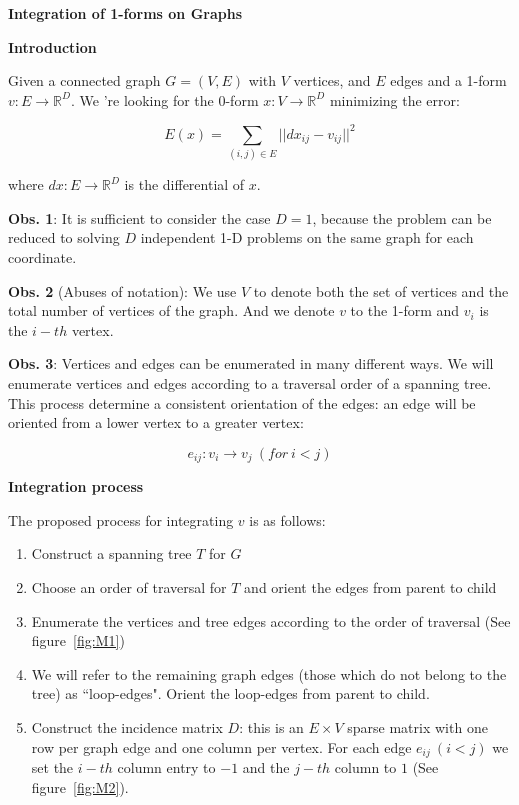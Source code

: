 \documentclass[a4paper,11pt]{article}
\begin{document}
\textbf{Integration of 1-forms on Graphs}

\bigskip

\textbf{Introduction}

\bigskip

Given a connected graph $G=(V,E)$ with $V$ vertices, and $E$ edges and a 
1-form $v: E \rightarrow \mathbb{R}^D$. We 're looking for the 0-form 
$x: V \rightarrow \mathbb{R}^D$ minimizing the error:

$$E(x) = \sum_{(i,j) \in E} ||dx_{ij} - v_{ij}||^2$$

where $dx: E \rightarrow \mathbb{R}^D$ is the differential of $x$.

\bigskip

\textbf{Obs. 1}: It is sufficient to consider the case $D=1$, because 
the problem can be reduced to solving $D$ independent 1-D problems on 
the same graph for each coordinate.

\bigskip

\textbf{Obs. 2} (Abuses of notation): We use $V$ to denote both the set 
of vertices and the total number of vertices of the graph. And we denote 
$v$ to the 1-form and $v_i$ is the $i-th$ vertex.

\bigskip

\textbf{Obs. 3}: Vertices and edges can be enumerated in many different 
ways. We will enumerate vertices and edges according to a traversal 
order of a spanning tree. This process determine a consistent 
orientation of the edges: an edge will be oriented from a lower vertex 
to a greater vertex:

$$e_{ij}: v_i \rightarrow v_j \ (for \ i < j)$$

\bigskip

\textbf{Integration process}

\bigskip

The proposed process for integrating $v$ is as follows:

\begin{enumerate}
	\item Construct a spanning tree $T$ for $G$
	\item Choose an order of traversal for $T$ and orient the edges 
	from parent to child
	\item Enumerate the vertices and tree edges according to the order 
	of traversal (See figure~\ref{fig:M1})
	\item We will refer to the remaining graph edges (those which do not 
	belong to the tree) as ``loop-edges". Orient the loop-edges from 
	parent to child.
	\item Construct the incidence matrix $D$: this is an $E \times V$ 
	sparse matrix with one row per graph edge and one column per vertex. For 
	each edge $e_{ij} \ (i < j)$ we set the $i-th$ column entry to $-1$ 
	and the $j-th$ column to $1$ (See figure~\ref{fig:M2}).
\end{enumerate}
\end{document}
